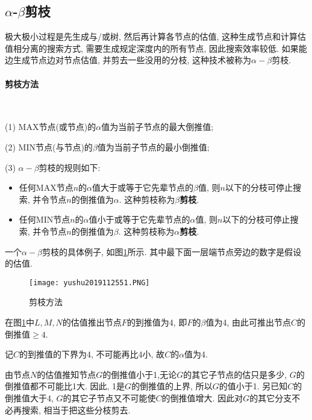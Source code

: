 \subsection{$\alpha$-$\beta$剪枝}
极大极小过程是先生成与/或树, 然后再计算各节点的估值, 这种生成节点和计算估值相分离的搜索方式, 需要生成规定深度内的所有节点, 因此搜索效率较低.
如果能边生成节点边对节点估值, 并剪去一些没用的分枝, 这种技术被称为$\alpha-\beta$剪枝.
\paragraph{剪枝方法}~{}

(1) \textup{MAX}节点(或节点)的$\alpha$值为当前子节点的最大倒推值;

(2) \textup{MIN}节点(与节点)的$\beta$值为当前子节点的最小倒推值;

(3) $\alpha-\beta$剪枝的规则如下:
    \begin{itemize}
    \item 任何MAX节点$n$的$\alpha$值大于或等于它先辈节点的$\beta$值, 则$n$以下的分枝可停止搜索, 并令节点$n$的倒推值为$\alpha$. 这种剪枝称为\textbf{$\beta$剪枝}.
    \item 任何MIN节点$n$的$\alpha$值小于或等于它先辈节点的$\alpha$值, 则$n$以下的分枝可停止搜索, 并令节点$n$的倒推值为$\beta$. 这种剪枝称为\textbf{$\alpha$剪枝}.
    \end{itemize}
\begin{example}
  一个$\alpha-\beta$剪枝的具体例子, 如图\ref{AI32fig51}所示. 其中最下面一层端节点旁边的数字是假设的估值.
\end{example}
\begin{figure}[H]
\centering
\texttt{[image: yushu2019112551.PNG]}
\caption{剪枝方法}
\label{AI32fig51}
\end{figure}
在图\ref{AI32fig51}中$L,M,N$的估值推出节点$F$的到推值为4, 即$F$的$\beta$值为4, 由此可推出节点$C$的倒推值$\geq 4$.

记$C$的到推值的下界为4, 不可能再比4小, 故$C$的$\alpha$值为4.

由节点$N$的估值推知节点$G$的倒推值小于1,无论$G$的其它子节点的估只是多少, $G$的倒推值都不可能比1大. 因此, 1是$G$的倒推值的上界, 所以$G$的值小于1.
另已知$C$的倒推值大于4, $G$的其它子节点又不可能使$C$的倒推值增大. 因此对$G$的其它分支不必再搜索, 相当于把这些分枝剪去.

